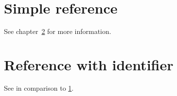 \documentclass[
    load-dhbw-templates,      %
    language = english,       %
    auto-intro-pages = custom %
]{iodhbwm}
\begin{document}
    \chapter{Simple reference}\label{chap:ref}
        See chapter~\ref{chap:cref} for more information.
    
    \chapter{Reference with identifier}\label{chap:cref}
        See  in comparison to \ref{chap:ref}.
\end{document}

